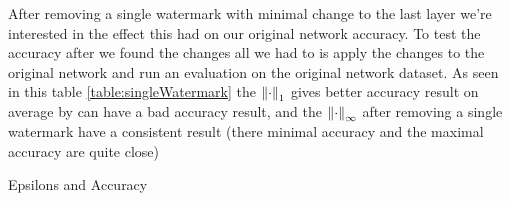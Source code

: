 \documentclass[a4paper]{llncs}
\begin{document}
After removing a single watermark with minimal change to the last layer we're interested in the effect this had on our original network accuracy. To test the accuracy after we found the changes all we had to is apply the changes to the original network and run an evaluation on the original network dataset.
As seen in this table \ref{table:singleWatermark} the $\left\lVert\cdot\right\rVert_1$ gives better accuracy result on average by can have a bad accuracy result, and the $\left\lVert\cdot\right\rVert_\infty$ after removing a single watermark have a consistent result (there minimal accuracy and the maximal accuracy are quite close)

\begin{table}[h!]
  \begin{center}
    \caption{Epsilons and Accuracy}
  \end{center}
  \label{table:singleWatermark}
\end{table}
\end{document}
